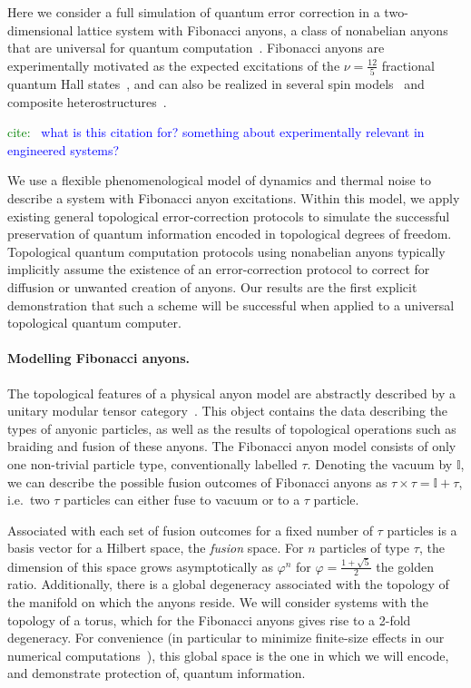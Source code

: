\documentclass[aps, prl, letterpaper, twocolumn, superscriptaddress, notitlepage, 10pt]{revtex4-1}
\newcommand{\cggb}[1]{\textcolor{blue}{#1}}
\newcommand{\stf}[1]{\textcolor{green}{#1}}
\begin{document}
Here we consider a full simulation of quantum error correction in a two-dimensional lattice 
system with Fibonacci anyons, a class of nonabelian anyons that are universal for quantum 
computation~\cite{Freedman2002, Nayak2008}. Fibonacci anyons are experimentally motivated as the 
expected excitations of the $\nu=\frac{12}{5}$ fractional quantum Hall 
states~\cite{Slingerland2001}, and can also be realized in several spin 
models~\cite{Levin2005, Kapit2013, Palumbo2014} and composite 
heterostructures~\cite{Mong2014}.

\stf{cite:~\cite{Bonesteel2012}} \cggb{what is this citation for? something about experimentally relevant in engineered systems?}

We use a flexible phenomenological model of dynamics and thermal noise to describe a system with Fibonacci anyon excitations. Within this model, we apply existing general topological error-correction protocols to simulate the successful preservation of quantum information encoded in topological degrees of freedom. Topological quantum computation protocols using nonabelian anyons typically implicitly assume the existence of an error-correction protocol to correct for diffusion or unwanted creation of anyons. Our results are the first explicit demonstration that such a scheme will be successful when applied to a universal topological quantum computer.

\paragraph{Modelling Fibonacci anyons.}

The topological features of a physical anyon model are abstractly described by a unitary 
modular tensor category~\cite{Wang2010b}. This object contains the data describing the 
types of anyonic particles, as well as the results of topological operations such as braiding and 
fusion of these anyons. The Fibonacci anyon model consists of only one non-trivial particle 
type, conventionally labelled $\tau$. Denoting the vacuum by $\mathbb{I}$, we can describe 
the possible fusion outcomes of Fibonacci anyons as $\tau\times\tau=\mathbb{I}+\tau$, 
i.e.~two $\tau$ particles can either fuse to vacuum or to a $\tau$ particle.

Associated with each set of fusion outcomes for a fixed number of $\tau$ particles is a basis 
vector for a Hilbert space, the \emph{fusion} space. For $n$ particles of type $\tau$, the 
dimension of this space grows asymptotically as $\varphi^n$ for $\varphi=\frac{1+\sqrt{5}}{2}$ 
the golden ratio. Additionally, there is a global degeneracy associated with the topology of the 
manifold on which the anyons reside. We will consider systems with the topology of a torus, 
which for the Fibonacci anyons gives rise to a 2-fold degeneracy. For convenience 
(in particular to minimize finite-size effects in our numerical computations~\cite{Brell2013}), 
this global space is the one in which we will encode, and demonstrate protection of, quantum 
information.
\end{document}
